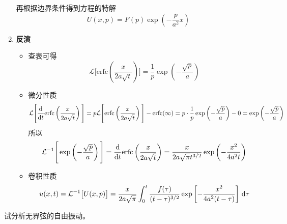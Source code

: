 \begin{enumerate}
	再根据边界条件得到方程的特解
	\begin{equation}
		U(x, p) = F(p) \exp\left(-\dfrac{p}{a^2}x\right)
	\end{equation}
	
	\item \textbf{反演}
	\begin{itemize}
		\item 查表可得
		\[
		\mathcal{L}\Bigg[\text{erfc}\left(\dfrac{x}{2a\sqrt{t}}\right)\Bigg] = \dfrac{1}{p}\exp \left(-\dfrac{\sqrt{p}}{a}\right)
		\]
		
		\item 微分性质
		\[
		\mathcal{L} \Bigg[\dfrac{{\rm{d}} }{{\rm{d}} t}\text{erfc}\left(\dfrac{x}{2a\sqrt{t}}\right)\Bigg] = p \mathcal{L}\Bigg[\text{erfc}\left(\dfrac{x}{2a\sqrt{t}}\right)\Bigg] - \text{erfc}(\infty) = p \cdot \dfrac{1}{p}\exp \left(-\dfrac{\sqrt{p}}{a}\right) - 0 = \exp \left(-\dfrac{\sqrt{p}}{a}\right) 
		\]
		所以
		\begin{equation}
			\mathcal{L}^{-1}  \Bigg[\exp \left(-\dfrac{\sqrt{p}}{a}\right)  \Bigg] = \dfrac{{\rm{d}} }{{\rm{d}} t}\text{erfc}\left(\dfrac{x}{2a\sqrt{t}}\right) = \dfrac{x}{2a \sqrt{\pi} t^{3/2}}\exp \left(-\dfrac{x^2}{4a^2t}\right)
		\end{equation}
		
		\item 卷积性质
		\begin{equation}
			u(x, t) = \mathcal{L}^{-1}\big[U(x, p)\big] = \dfrac{x}{2a \sqrt{\pi}}\int_0^t \dfrac{f(\tau)}{(t - \tau)^{3/2}} \exp \left[- \dfrac{x^2}{4a^2(t - \tau)}\right]\, {\rm{d}} \tau
		\end{equation}
	\end{itemize}
\end{enumerate}
\clearpage

\example[无界弦的自由振动]
试分析无界弦的自由振动。

